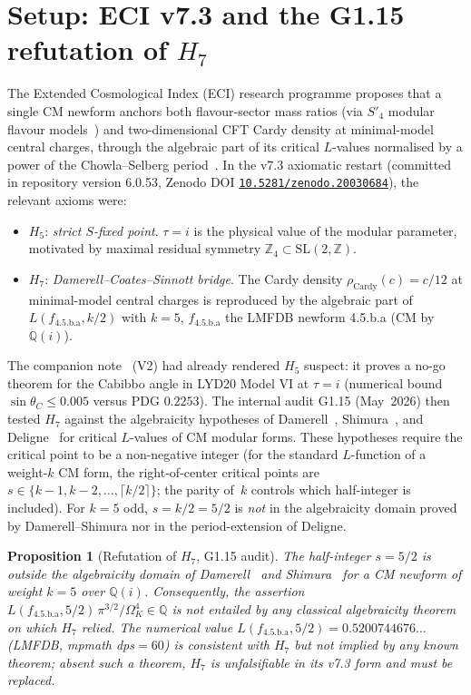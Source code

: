 \documentclass[a4paper,11pt]{article}
\newcommand{\Spf}{S'_4}
\newcommand{\OmK}{\Omega_K}
\newcommand{\fLM}{f_{\text{4.5.b.a}}}
\newcommand{\Qi}{\mathbb{Q}(i)}
\newcommand{\Zeno}{\href{https://doi.org/10.5281/zenodo.20030684}{\texttt{10.5281/zenodo.20030684}}}
\newtheorem{proposition}[theorem]{Proposition}
\theoremstyle{definition}
\theoremstyle{remark}
\begin{document}
\section{Setup: ECI v7.3 and the G1.15 refutation of $H_7$}
\label{sec:setup}

The Extended Cosmological Index (ECI) research programme proposes that
a single CM newform anchors both flavour-sector mass ratios (via
$\Spf$ modular flavour models~\cite{NPP20,LYD20,dMVP26}) and
two-dimensional CFT Cardy density at minimal-model central charges,
through the algebraic part of its critical $L$-values normalised by a
power of the Chowla--Selberg period~\cite{ChowSel49}.  In the v7.3
axiomatic restart (committed in repository version 6.0.53, Zenodo DOI
\Zeno), the relevant axioms were:
\begin{itemize}
  \item $H_5$: \emph{strict $S$-fixed point}.  $\tau = i$ is the
    physical value of the modular parameter, motivated by maximal
    residual symmetry $\mathbb{Z}_4\subset\mathrm{SL}(2,\mathbb{Z})$.
  \item $H_7$: \emph{Damerell--Coates--Sinnott bridge}.  The Cardy
    density $\rho_{\mathrm{Cardy}}(c)=c/12$ at minimal-model central
    charges is reproduced by the algebraic part of $L(\fLM, k/2)$ with
    $k=5$, $\fLM$ the LMFDB newform 4.5.b.a (CM by $\Qi$).
\end{itemize}

The companion note~\cite{V2NoGo} (V2) had already rendered $H_5$
suspect: it proves a no-go theorem for the Cabibbo angle in LYD20
Model VI at $\tau=i$ (numerical bound $\sin\theta_C \le 0.005$ versus
PDG $0.2253$).  The internal audit G1.15 (May~2026) then tested $H_7$
against the algebraicity hypotheses of Damerell~\cite{Damerell71},
Shimura~\cite{Shimura76}, and Deligne~\cite{Deligne79} for critical
$L$-values of CM modular forms.  These hypotheses require the critical
point to be a non-negative integer (for the standard $L$-function of a
weight-$k$ CM form, the right-of-center critical points are
$s\in\{k-1, k-2,\ldots, \lceil k/2\rceil\}$; the parity of~$k$
controls which half-integer is included).  For $k=5$ odd, $s=k/2=5/2$
is \emph{not} in the algebraicity domain proved by Damerell--Shimura
nor in the period-extension of Deligne.

\begin{proposition}[Refutation of $H_7$, G1.15 audit]
\label{prop:refute}
The half-integer $s=5/2$ is outside the algebraicity domain of
Damerell~\cite{Damerell71} and Shimura~\cite{Shimura76} for a CM
newform of weight $k=5$ over $\Qi$.  Consequently, the assertion
$L(\fLM, 5/2)\,\pi^{3/2}/\OmK^{4}\in\mathbb{Q}$ is not entailed by
any classical algebraicity theorem on which $H_7$ relied.
The numerical value $L(\fLM, 5/2) = 0.5200744676\ldots$ (LMFDB,
mpmath dps$=60$) is consistent with $H_7$ but not implied by any
known theorem; absent such a theorem, $H_7$ is unfalsifiable in its
v7.3 form and must be replaced.
\end{proposition}
\end{document}
